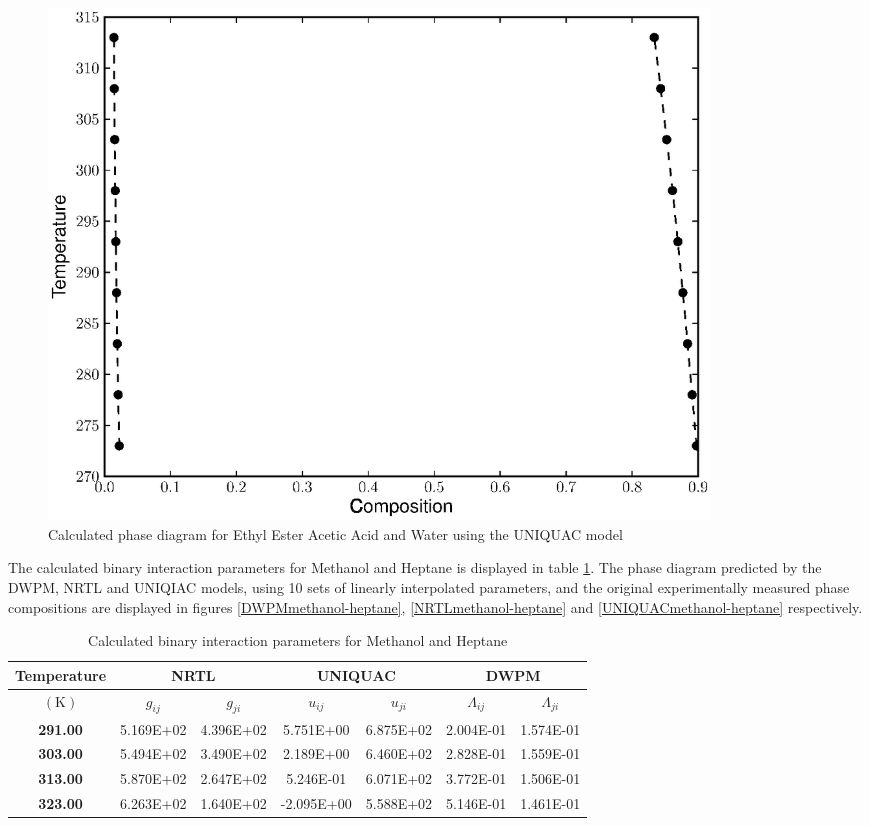 \begin{figure}[hp]
\centering
\includegraphics[width = 0.85\textwidth]{Results_Parts/BinaryParams/ethylesteraceticacid-water/UNIQUAC/PhaseDiagram.eps}
\caption{Calculated phase diagram for Ethyl Ester Acetic Acid and Water using the UNIQUAC model} \label{UNIQUACethylesteraceticacid-water}
\end{figure}	

\clearpage



The calculated binary interaction parameters for Methanol and Heptane is displayed in table \ref{methanol-heptaneTable}. The phase diagram predicted by the DWPM, NRTL and UNIQIAC models, using 10 sets of linearly interpolated parameters, and the original experimentally measured phase compositions are displayed in figures \ref{DWPMmethanol-heptane}, \ref{NRTLmethanol-heptane} and \ref{UNIQUACmethanol-heptane} respectively.\\


\begin{table}
\begin{tabularx}{\textwidth}{c|cc|cc|cc}
\hline
\textbf{Temperature}&\multicolumn{2}{c|}{\textbf{NRTL}}&\multicolumn{2}{c|}{\textbf{UNIQUAC}}&\multicolumn{2}{c}{\textbf{DWPM}}\\
\hline
\hline 
$\left(\mathrm{K}\right)$&$g_{ij}$&$g_{ji}$&$u_{ij}$&$u_{ji}$&$\Lambda_{ij}$&$\Lambda_{ji}$\\
\hline
\textbf{ 291.00 } & 5.169E+02 & 4.396E+02 & 5.751E+00 & 6.875E+02 & 2.004E-01 & 1.574E-01\\
\textbf{ 303.00 } & 5.494E+02 & 3.490E+02 & 2.189E+00 & 6.460E+02 & 2.828E-01 & 1.559E-01\\
\textbf{ 313.00 } & 5.870E+02 & 2.647E+02 & 5.246E-01 & 6.071E+02 & 3.772E-01 & 1.506E-01\\
\textbf{ 323.00 } & 6.263E+02 & 1.640E+02 & -2.095E+00 & 5.588E+02 & 5.146E-01 & 1.461E-01\\
\hline
\end{tabularx}\\
\caption{Calculated binary interaction parameters for Methanol and Heptane} \label{methanol-heptaneTable}
\end{table}

